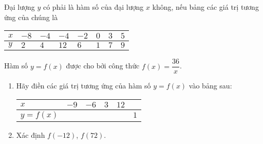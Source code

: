 \begin{bt}%
Đại lượng $y$ có phải là hàm số của đại lượng $x$ không, nếu bảng các giá trị tương ứng của chúng là
\begin{center}
\begin{tabular}{|>{\centering\arraybackslash}p{2cm}|>{\centering\arraybackslash}p{1cm}|>{\centering\arraybackslash}p{1cm}|>{\centering\arraybackslash}p{1cm}|>{\centering\arraybackslash}p{1cm}|>{\centering\arraybackslash}p{1cm}|>{\centering\arraybackslash}p{1cm}|>{\centering\arraybackslash}p{1cm}|}
\hline 
$x$ & $-8$ & $-4$ & $-4$ & $-2$ & $0$ & $3$ & $5$ \\ 
\hline 
$y$ & $2$ & $4$ & $12$ & $6$ & $1$ & $7$ & $9$ \\ 
\hline 
\end{tabular} 
\end{center}
\end{bt}
\begin{bt}%
Hàm số $y=f(x)$ được cho bởi công thức $f(x)=\dfrac{36}{x}$.
\begin{enumerate}
\item Hãy điền các giá trị tương ứng của hàm số $y=f(x)$ vào bảng sau:
\begin{center}
\begin{tabular}{|>{\centering\arraybackslash}p{2.5cm}|>{\centering\arraybackslash}p{1cm}|>{\centering\arraybackslash}p{1cm}|>{\centering\arraybackslash}p{1cm}|>{\centering\arraybackslash}p{1cm}|>{\centering\arraybackslash}p{1cm}|}
\hline 
$x$ & $-9$ & $-6$ & $3$ & $12$ &  \\ 
\hline 
$y=f(x)$ &  &  &  &  & $1$ \\ 
\hline 
\end{tabular} 
\end{center}
\item Xác định $f(-12)$, $f(72)$.
\end{enumerate}
\end{bt}
